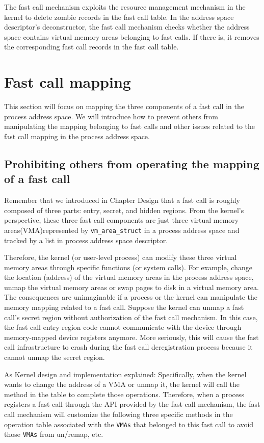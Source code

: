 The fast call mechanism exploits the resource management mechanism 
in the kernel to delete zombie records in the fast call table. 
In the address space descriptor's deconstructor, the fast call mechanism 
checks whether the address space contains virtual memory areas belonging 
to fast calls. If there is, it removes the corresponding fast 
call records in the fast call table.

\section{Fast call mapping}
This section will focus on mapping the three components of 
a fast call in the process address space. We will introduce 
how to prevent others from manipulating the mapping 
belonging to fast calls and 
other issues related to the fast call mapping in the process address space.
\subsection{Prohibiting others from operating the mapping of a fast call}
Remember that we introduced in Chapter Design 
that a fast call is roughly composed of three parts: 
entry, secret, and hidden regions. From the kernel's perspective, 
these three fast call components are just three virtual memory 
areas(VMA)represented by \verb|vm_area_struct| in a process address space and 
tracked by a list in process address space descriptor.

Therefore, the kernel (or user-level process) can modify these three 
virtual memory areas through specific functions (or system calls). 
For example, change the location (address) of the virtual memory 
areas in the process address space, unmap the virtual memory areas 
or swap pages to disk in a virtual memory area. The consequences 
are unimaginable if a process or the kernel can manipulate the memory 
mapping related to a fast call. Suppose the kernel can unmap a fast 
call's secret region without authorization of the fast call mechanism. 
In this case, the fast call entry region code cannot communicate with the device through 
memory-mapped device registers anymore.  More seriously, this will cause the 
fast call infrastructure to crash during the fast call deregistration 
process because it cannot unmap the secret region.

As Kernel design and implementation explained: Specifically, 
when the kernel wants to change the address of a VMA or unmap it, 
the kernel will call the method in the table to complete those 
operations. Therefore, when a process registers a fast call through 
the API provided by the fast call mechanism, the fast call mechanism 
will customize the following three specific methods in the operation
table associated with the \verb|VMAs| that belonged to this fast call to avoid 
those \verb|VMAs| from un/remap, etc.

